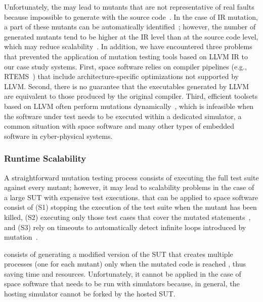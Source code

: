 Unfortunately, the 
may lead to mutants that are not representative of real faults because impossible to generate with the source code~\cite{schuler2009efficient}.
In the case of IR mutation, a part of these mutants can be automatically identified~\cite{denisov2018mull}; however,
the number of generated mutants tend to be higher at the IR level than at the source code level, which may reduce scalability~\cite{hariri2019comparing}.
 In addition, we have encountered three problems that prevented the application of 
 mutation testing tools based on  LLVM IR to our case study systems.
First, space software relies on compiler pipelines (e.g., RTEMS~\cite{RTEMS}) that include architecture-specific optimizations not supported by LLVM. 
Second, there is no guarantee that the executables generated by LLVM are equivalent to those produced by the original compiler.
 Third, efficient toolsets based on LLVM often  perform mutations dynamically~\cite{denisov2018mull}, which is infeasible when the software under test needs to be executed within a dedicated simulator, a common situation with space software and many other types of embedded software in cyber-physical systems.




\subsubsection{Runtime Scalability}
\label{sec:scalability}

A straightforward mutation testing process consists of executing the full test suite against every mutant; however, it may lead to scalability problems in the case of a large SUT with expensive test executions.
 that can be applied to space software consist of (S1) stopping the execution of the test suite when the mutant has been killed, (S2) executing only those test cases that cover the mutated statements~\cite{delamaro1996proteum}, and (S3) rely on timeouts to automatically detect infinite loops introduced by mutation~\cite{papadakis2019mutation}. 

 consists of generating a modified version of the SUT that creates multiple processes (one for each mutant) only when the mutated code is reached \cite{king1991fortran,tokumoto2016muvm}, thus saving time and resources. Unfortunately, it cannot be applied in the case of space software that needs to be run with simulators because, in general, the hosting simulator cannot be forked by the hosted SUT.


